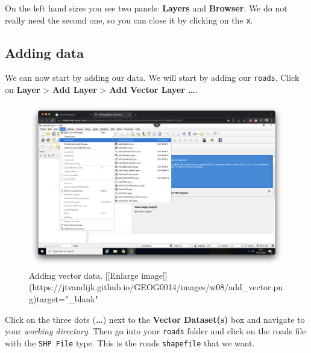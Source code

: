 \documentclass[
]{book}
\begin{document}
On the left hand sizes you see two panels: \textbf{Layers} and \textbf{Browser}. We do not really need the second one, so you can close it by clicking on the \texttt{x}.

\hypertarget{adding-data}{%
\subsection*{Adding data}\label{adding-data}}

We can now start by adding our data. We will start by adding our \texttt{roads}. Click on \textbf{Layer} \textgreater{} \textbf{Add Layer} \textgreater{} \textbf{Add Vector Layer \ldots{}}.

\begin{figure}

{\centering \includegraphics[width=850pt]{images/w08/add_vector} 

}

\caption{Adding vector data. [[Enlarge image]](https://jtvandijk.github.io/GEOG0014/images/w08/add_vector.png){target="_blank"}}\label{fig:add-vector}
\end{figure}

Click on the three dots (\textbf{\ldots{}}) next to the \textbf{Vector Dataset(s)} box and navigate to your \emph{working directory}. Then go into your \texttt{roads} folder and click on the roads file with the \texttt{SHP\ File} type. This is the roads \texttt{shapefile} that we want.
\end{document}
